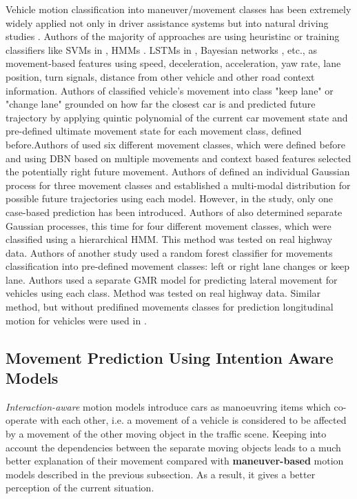 Vehicle motion classification into maneuver/movement classes has been extremely widely applied not only in driver assistance systems but into natural driving studies \cite{DataDrivenIV, DataDrivenV, DataDrivenVI, mab1, mab2, mab3, mab4, mab5, mab6, mab7}. Authors of the majority of approaches are using heuristinc \cite{mab1} or training classifiers like \glspl{SVM} in \cite{mab2}, \glspl{HMM} \cite{DataDrivenIV, mab3, mab4}. \glspl{LSTM} in \cite{mab5}, Bayesian networks \cite{mab6}, etc., as movement-based features using speed, deceleration, acceleration, yaw rate, lane position, turn signals, distance from other vehicle and other road context information. Authors of \cite{mab1} classified vehicle's movement into class "keep lane" or "change lane" grounded on how far the closest car is and predicted future trajectory by applying quintic polynomial of the current car movement state and pre-defined ultimate movement state for each movement class, defined before.Authors of \cite{mab6} used six different movement classes, which were defined before and using \gls{DBN} based on multiple movements and context based features selected the potentially right future movement. Authors of \cite{mab7} defined an individual Gaussian process for three movement classes and established a multi-modal distribution for possible future trajectories using each model. However, in the study, only one case-based prediction has been introduced. Authors of \cite{DataDrivenIV} also determined separate Gaussian processes, this time for four different movement classes, which were classified using a hierarchical \gls{HMM}. This method was tested on real highway data. Authors of another study \cite{DataDrivenV} used a random forest classifier for movements classification into pre-defined movement classes: left or right lane changes or keep lane. Authors used a separate \gls{GMR} model for predicting lateral movement for vehicles using each class. Method was tested on real highway data. Similar method, but without predifined movements classes for prediction longitudinal motion for vehicles were used in \cite{DataDrivenVI}.

\subsection{Movement Prediction Using Intention Aware Models}
\label{subsection:inaw}

\textit{Interaction-aware} motion models introduce cars as
manoeuvring items which co-operate with each other, i.e. a movement of a vehicle is considered to be affected by a movement of the other moving object in the traffic scene. Keeping into account the dependencies between the separate moving objects leads to a much better explanation of their movement compared with \textbf{maneuver-based} motion models described in the previous subsection.  As a result, it gives a better perception of the current situation. \\


